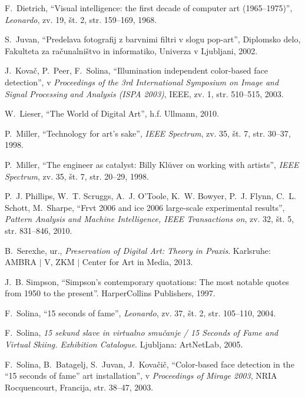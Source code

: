 \documentclass[a4paper, 12pt]{book}
\begin{document}
\begin{thebibliography}{99}
F.~Dietrich, ``Visual intelligence: the first decade of computer art (1965--1975)'', \textit{Leonardo}, zv. 19, št. 2, str. 159--169, 1968.

S.~Juvan, ``Predelava fotografij z barvnimi filtri v slogu pop-art'', Diplomsko delo, Fakulteta za računalništvo in informatiko, Univerza v Ljubljani, 2002.

 J.~Kovač, P.~Peer, F.~Solina, ``Illumination independent color-based face detection'', v \textit{Proceedings of the 3rd International Symposium on Image and Signal Processing and Analysis (ISPA 2003)}, IEEE, zv. 1, str. 510--515, 2003.

W.~Lieser, ``The World of Digital Art'', h.f. Ullmann, 2010.

P.~Miller, ``Technology for art's sake'', \textit{IEEE Spectrum}, zv. 35, št. 7, str. 30--37, 1998.

P.~Miller, ``The engineer as catalyst: Billy Kl\"{u}ver on working with artists'', \textit{IEEE Spectrum}, zv. 35, št. 7, str. 20--29, 1998.

P.~J. Phillips, W.~T. Scruggs, A.~J. O’Toole, K.~W. Bowyer, P.~J. Flynn, C.~L. Schott, M.~Sharpe, ``Frvt 2006 and ice 2006 large-scale experimental results'', \textit{Pattern Analysis and Machine Intelligence, IEEE Transactions on}, zv. 32, št. 5, str. 831--846, 2010.

B.~Serexhe, ur., \textit{Preservation of Digital Art: Theory in Praxis}. Karlsruhe: AMBRA $|$ V, ZKM $|$ Center for Art in Media, 2013.

J.~B. Simpson, ``Simpson's contemporary quotations: The most notable quotes from 1950 to the present''. HarperCollins Publishers, 1997.

F.~Solina, ``15 seconds of fame'', \textit{Leonardo}, zv. 37, št. 2, str. 105--110, 2004.

F.~Solina, \textit{15 sekund slave in virtualno smučanje / 15 Seconds of Fame and Virtual Skiing. Exhibition Catalogue}. Ljubljana: ArtNetLab, 2005.

F.~Solina, B.~Batagelj, S.~Juvan, J.~Kovačič, ``Color-based face detection in the ``15 seconds of fame'' art installation'', v \textit{Proceedings of Mirage 2003}, NRIA Rocquencourt, Francija, str. 38--47, 2003.


\end{thebibliography}
\end{document}
